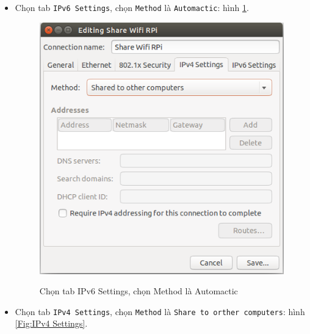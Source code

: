 \begin{itemize}
\begin{figure}[!h]
\begin{center}
\end{center}
\end{figure}
\item Chọn tab \verb|IPv6 Settings|, chọn \verb|Method| là \verb|Automactic|: hình \ref{Fig:IPv6 Settings}.
\begin{figure}[!h]
\begin{center}
{\includegraphics[scale=.4]{network/images/share-wifi-5}}
\caption{Chọn tab \textsf{IPv6 Settings}, chọn \textsf{Method} là \textsf{Automactic}}\label{Fig:IPv6 Settings}
\end{center}
\end{figure}
\item Chọn tab \verb|IPv4 Settings|, chọn \verb|Method| là \verb|Share to orther computers|: hình \ref{Fig:IPv4 Settings}.
\begin{figure}[!h]
\begin{center}

\end{center}
\end{figure}
\end{itemize}
